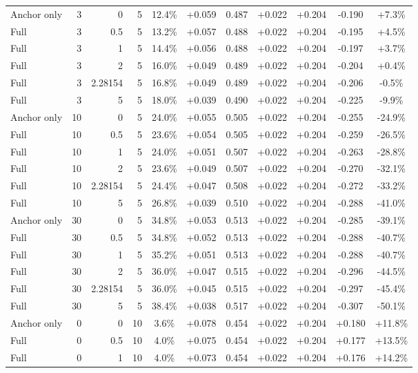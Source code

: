 \begin{table}[htbp]
\begin{tabular}{lrrrccccccc}
Anchor only & 3 & 0 & 5 & 12.4\% & +0.059 & 0.487 & +0.022 & +0.204 & -0.190 & +7.3\% \\
Full & 3 & 0.5 & 5 & 13.2\% & +0.057 & 0.488 & +0.022 & +0.204 & -0.195 & +4.5\% \\
Full & 3 & 1 & 5 & 14.4\% & +0.056 & 0.488 & +0.022 & +0.204 & -0.197 & +3.7\% \\
Full & 3 & 2 & 5 & 16.0\% & +0.049 & 0.489 & +0.022 & +0.204 & -0.204 & +0.4\% \\
Full & 3 & 2.28154 & 5 & 16.8\% & +0.049 & 0.489 & +0.022 & +0.204 & -0.206 & -0.5\% \\
Full & 3 & 5 & 5 & 18.0\% & +0.039 & 0.490 & +0.022 & +0.204 & -0.225 & -9.9\% \\
Anchor only & 10 & 0 & 5 & 24.0\% & +0.055 & 0.505 & +0.022 & +0.204 & -0.255 & -24.9\% \\
Full & 10 & 0.5 & 5 & 23.6\% & +0.054 & 0.505 & +0.022 & +0.204 & -0.259 & -26.5\% \\
Full & 10 & 1 & 5 & 24.0\% & +0.051 & 0.507 & +0.022 & +0.204 & -0.263 & -28.8\% \\
Full & 10 & 2 & 5 & 23.6\% & +0.049 & 0.507 & +0.022 & +0.204 & -0.270 & -32.1\% \\
Full & 10 & 2.28154 & 5 & 24.4\% & +0.047 & 0.508 & +0.022 & +0.204 & -0.272 & -33.2\% \\
Full & 10 & 5 & 5 & 26.8\% & +0.039 & 0.510 & +0.022 & +0.204 & -0.288 & -41.0\% \\
Anchor only & 30 & 0 & 5 & 34.8\% & +0.053 & 0.513 & +0.022 & +0.204 & -0.285 & -39.1\% \\
Full & 30 & 0.5 & 5 & 34.8\% & +0.052 & 0.513 & +0.022 & +0.204 & -0.288 & -40.7\% \\
Full & 30 & 1 & 5 & 35.2\% & +0.051 & 0.513 & +0.022 & +0.204 & -0.288 & -40.7\% \\
Full & 30 & 2 & 5 & 36.0\% & +0.047 & 0.515 & +0.022 & +0.204 & -0.296 & -44.5\% \\
Full & 30 & 2.28154 & 5 & 36.0\% & +0.045 & 0.515 & +0.022 & +0.204 & -0.297 & -45.4\% \\
Full & 30 & 5 & 5 & 38.4\% & +0.038 & 0.517 & +0.022 & +0.204 & -0.307 & -50.1\% \\
Anchor only & 0 & 0 & 10 & 3.6\% & +0.078 & 0.454 & +0.022 & +0.204 & +0.180 & +11.8\% \\
Full & 0 & 0.5 & 10 & 4.0\% & +0.075 & 0.454 & +0.022 & +0.204 & +0.177 & +13.5\% \\
Full & 0 & 1 & 10 & 4.0\% & +0.073 & 0.454 & +0.022 & +0.204 & +0.176 & +14.2\% \\

\end{tabular}
\end{table}

